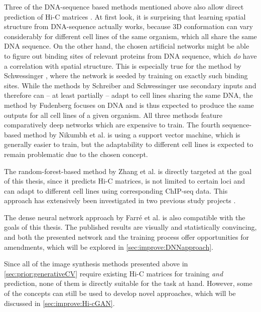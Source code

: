 Three of the DNA-sequence based methods mentioned above also allow direct prediction of Hi-C matrices 
\cite{Schreiber2017, Fudenberg2020, Schwessinger2019}.
At first look, it is surprising that learning spatial structure from DNA-sequence actually works, 
because 3D conformation can vary considerably for different cell lines of the same organism, which all share the same DNA sequence.
On the other hand, the chosen artificial networks might be able to figure out binding sites of relevant proteins from DNA sequence,
which \emph{do} have a correlation with spatial structure. 
This is especially true for the method by Schwessinger \cite{Schwessinger2019},
where the network is seeded by training on exactly such binding sites.
While the methods by Schreiber and Schwessinger use secondary inputs and therefore can -- at least partially -- 
adapt to cell lines sharing the same DNA, the method by Fudenberg focuses on DNA and is thus 
expected to produce the same outputs for all cell lines of a given organism.
All three methods feature comparatively deep networks which are expensive to train.
The fourth sequence-based method by Nikumbh et al. \cite{Nikumbh2017} is using a support vector machine, which is generally easier to train,
but the adaptability to different cell lines is expected to remain problematic due to the chosen concept.

The random-forest-based method by Zhang et al. \cite{Zhang2019} is directly targeted at the goal of this thesis,
since it predicts Hi-C matrices, is not limited to certain loci and can adapt to different cell lines using 
corresponding ChIP-seq data.
This approach has extensively been investigated in two previous study projects \cite{Krauth2020,Bajorat2019}.

The dense neural network approach by Farr\'e et al. \cite{Farre2018a} is also compatible with the goals of this thesis.
The published results are visually and statistically convincing, and both the presented network and the training process offer
opportunities for amendments, which will be explored in \cref{sec:improve:DNNapproach}.

Since all of the image synthesis methods presented above in \cref{sec:prior:generativeCV} require existing Hi-C matrices 
for training \emph{and} prediction, none of them is directly suitable for the task at hand.
However, some of the concepts can still be used to develop novel approaches, which will be discussed in \cref{sec:improve:Hi-cGAN}.
\clearpage
